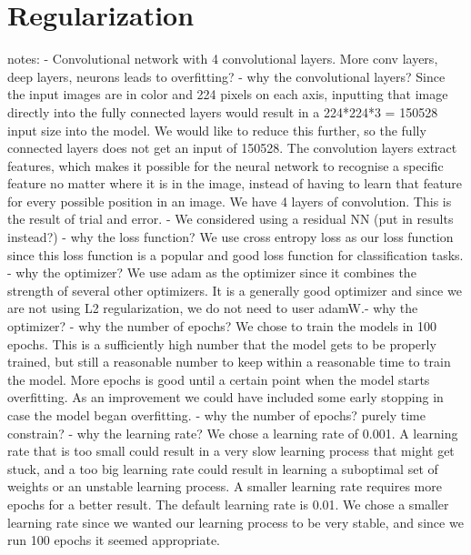 \section{Regularization}




notes:
- Convolutional network with 4 convolutional layers. More conv layers, deep layers, neurons leads to overfitting?
- why the convolutional layers?
Since the input images are in color and 224 pixels on each axis, inputting that image directly into the fully connected layers would result in a 224*224*3 = 150528 input size into the model. We would like to reduce this further, so the fully connected layers does not get an input of 150528. The convolution layers extract features, which makes it possible for the neural network to recognise a specific feature no matter where it is in the image, instead of having to learn that feature for every possible position in an image. We have 4 layers of convolution. This is the result of trial and error.
- We considered using a residual NN (put in results instead?)
- why the loss function?
We use cross entropy loss as our loss function since this loss function is a popular and good loss function for classification tasks.
- why the optimizer?
We use adam as the optimizer since it combines the strength of several other optimizers. It is a generally good optimizer and since we are not using L2 regularization, we do not need to user adamW.- why the optimizer?
- why the number of epochs?
We chose to train the models in 100 epochs. This is a sufficiently high number that the model gets to be properly trained, but still a reasonable number to keep within a reasonable time to train the model. More epochs is good until a certain point when the model starts overfitting. As an improvement we could have included some early stopping in case the model began overfitting. - why the number of epochs? purely time constrain?
- why the learning rate?
We chose a learning rate of 0.001. A learning rate that is too small could result in a very slow learning process that might get stuck, and a too big learning rate could result in learning a suboptimal set of weights or an unstable learning process. A smaller learning rate requires more epochs for a better result. The default learning rate is 0.01. We chose a smaller learning rate since we wanted our learning process to be very stable, and since we run 100 epochs it seemed appropriate.

